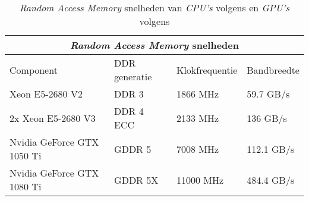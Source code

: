 \begin{table}[b]
    \begin{tabular}{ |p{5.3cm}|p{2.9cm}|p{3.0cm}|p{2.7cm}|  }
        \hline
        \multicolumn{4}{|c|}{\textit{Random Access Memory} snelheden} \\
        \hline
        Component& DDR generatie & Klokfrequentie & Bandbreedte \\
        \hline
            Xeon E5-2680 V2             & DDR 3     & 1866 MHz  & 59.7 GB/s \\
            2x Xeon E5-2680 V3          & DDR 4 ECC & 2133 MHz  & 136 GB/s  \\
            Nvidia GeForce GTX 1050 Ti  & GDDR 5    & 7008 MHz  & 112.1 GB/s\\
            Nvidia GeForce GTX 1080 Ti  & GDDR 5X   & 11000 MHz & 484.4 GB/s\\
        \hline
    \end{tabular}
    \caption[Verschillen in RAM snelheden voor \textit{CPU's} en \textit{GPU's}~\autocite{Intel2013,Intel2014,TechPowerUp2016, TechPowerUp2017}]{\textit{Random Access Memory} snelheden van \textit{CPU's} volgens \textcite{Intel2013,Intel2014} en \textit{GPU's} volgens \textcite{TechPowerUp2016, TechPowerUp2017}}
    \label{tab:RAMSpeeds}
\end{table}

